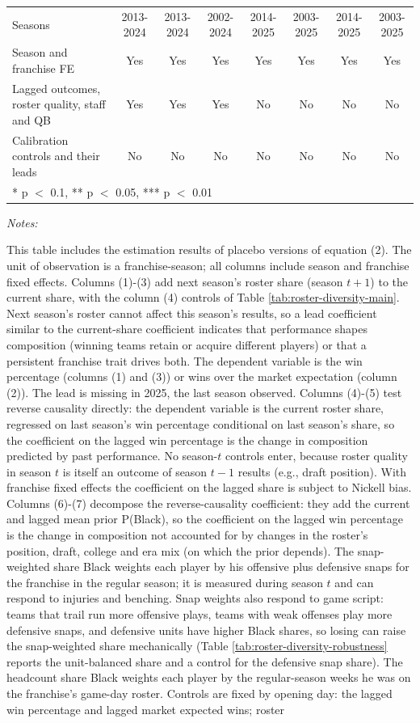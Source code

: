 \begin{table}[!h]
{\begin{threeparttable}
\begin{tabular}[t]{lccccccc}
Seasons & 2013-2024 & 2013-2024 & 2002-2024 & 2014-2025 & 2003-2025 & 2014-2025 & 2003-2025\\
Season and franchise FE & Yes & Yes & Yes & Yes & Yes & Yes & Yes\\
Lagged outcomes, roster quality, staff and QB & Yes & Yes & Yes & No & No & No & No\\
Calibration controls and their leads & No & No & No & No & No & No & No\\
\bottomrule
\multicolumn{8}{l}{\rule{0pt}{1em}* p $<$ 0.1, ** p $<$ 0.05, *** p $<$ 0.01}\\
\end{tabular}
\begin{tablenotes}[para]
\item \textit{Notes:} 
\item This table includes the estimation results of placebo versions of equation (2). The unit of observation is a franchise-season; all columns include season and franchise fixed effects. Columns (1)-(3) add next season's roster share (season $t+1$) to the current share, with the column (4) controls of Table \ref{tab:roster-diversity-main}. Next season's roster cannot affect this season's results, so a lead coefficient similar to the current-share coefficient indicates that performance shapes composition (winning teams retain or acquire different players) or that a persistent franchise trait drives both. The dependent variable is the win percentage (columns (1) and (3)) or wins over the market expectation (column (2)).   The lead is missing in 2025, the last season observed. Columns (4)-(5) test reverse causality directly: the dependent variable is the current roster share, regressed on last season's win percentage conditional on last season's share, so the coefficient on the lagged win percentage is the change in composition predicted by past performance. No season-$t$ controls enter, because roster quality in season $t$ is itself an outcome of season $t-1$ results (e.g., draft position). With franchise fixed effects the coefficient on the lagged share is subject to Nickell bias.  Columns (6)-(7) decompose the reverse-causality coefficient: they add the current and lagged mean prior P(Black), so the coefficient on the lagged win percentage is the change in composition not accounted for by changes in the roster's position, draft, college and era mix (on which the prior depends). The snap-weighted share Black weights each player by his offensive plus defensive snaps for the franchise in the regular season; it is measured during season $t$ and can respond to injuries and benching. Snap weights also respond to game script: teams that trail run more offensive plays, teams with weak offenses play more defensive snaps, and defensive units have higher Black shares, so losing can raise the snap-weighted share mechanically (Table \ref{tab:roster-diversity-robustness} reports the unit-balanced share and a control for the defensive snap share). The headcount share Black weights each player by the regular-season weeks he was on the franchise's game-day roster. Controls are fixed by opening day: the lagged win percentage and lagged market expected wins; roster 
\end{tablenotes}
\end{threeparttable}}
\end{table}
